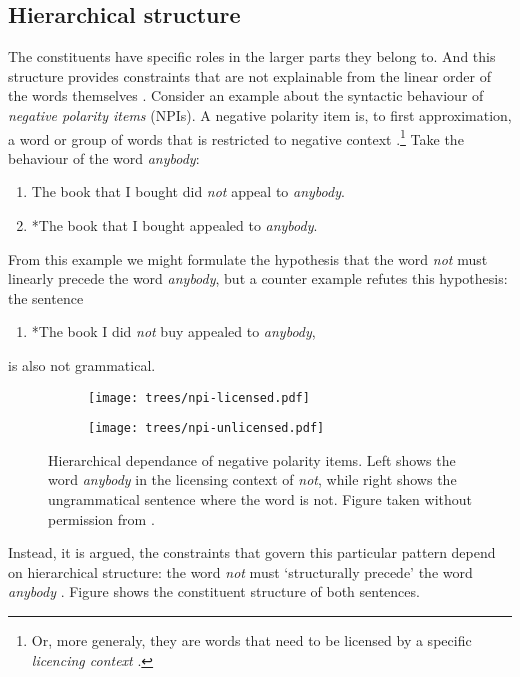\subsection{Hierarchical structure} The constituents have specific roles in the larger parts they belong to. And this structure provides constraints that are not explainable from the linear order of the words themselves \citep{everaert2015structures}. Consider an example about the syntactic behaviour of \textit{negative polarity items} (NPIs). A negative polarity item is, to first approximation, a word or group of words that is restricted to negative context \citep{everaert2015structures}.\footnote{Or, more generaly, they are words that need to be licensed by a specific \textit{licencing context} \citep{giannakidou2011npi}.} Take the behaviour of the word \textit{anybody}:
\begin{enumerate}[noitemsep]
  \item The book that I bought did \textit{not} appeal to \textit{anybody}.
  \item *The book that I bought appealed to \textit{anybody}.
\end{enumerate}
From this example we might formulate the hypothesis that the word \textit{not} must linearly precede the word \textit{anybody}, but a counter example refutes this hypothesis: the sentence
\begin{enumerate}
  \item *The book I did \textit{not} buy appealed to \textit{anybody},
\end{enumerate}
is also not grammatical.

\begin{figure}[h]
  \begin{subfigure}[b]{0.5\textwidth}
		\texttt{[image: trees/npi-licensed.pdf]}
	\end{subfigure}
	\begin{subfigure}[b]{0.5\textwidth}
		\texttt{[image: trees/npi-unlicensed.pdf]}
	\end{subfigure}
\caption{Hierarchical dependance of negative polarity items. Left shows the word \textit{anybody} in the licensing context of \textit{not}, while right shows the ungrammatical sentence where the word is not. Figure taken without permission from \cite{everaert2015structures}.}
\label{fig:trees-npi}
\end{figure}

Instead, it is argued, the constraints that govern this particular pattern depend on hierarchical structure: the word \textit{not} must `structurally precede' the word \textit{anybody} \citep{everaert2015structures}. Figure \label{ref:trees-npi} shows the constituent structure of both sentences.

